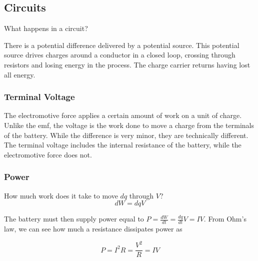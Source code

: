 \documentclass{article}
\begin{document}
\subsection{Circuits}

What happens in a circuit?

There is a potential difference delivered by a potential source. This potential source drives charges around a conductor in a closed loop, crossing through resistors and
losing energy in the process. The charge carrier returns having lost all energy.

\subsubsection{Terminal Voltage}

The electromotive force applies a certain amount of work on a unit of charge. Unlike the emf, the voltage is the work done to move a charge from the terminals of the 
battery. While the difference is very minor, they are technically different. The terminal voltage includes the internal resistance of the battery, while the electromotive 
force does not.

\subsubsection{Power}

How much work does it take to move $dq$ through $V$?
$$ dW= dq V $$

The battery must then supply power equal to $P=\frac{dW}{dt}=\frac{dq}{dt}V=IV$. From Ohm's law, we can see how much a resistance dissipates power as

\begin{equation} P=I^2R=\frac{V^2}{R}=IV \end{equation}
\end{document}
